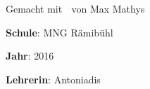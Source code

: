 {\Large Gemacht mit 💖 von Max Mathys 👊}

\vspace{.7em}

\textbf{Schule}: MNG Rämibühl
\vspace{.2em}

\textbf{Jahr}: 2016
\vspace{.2em}

\textbf{Lehrerin}: Antoniadis	
